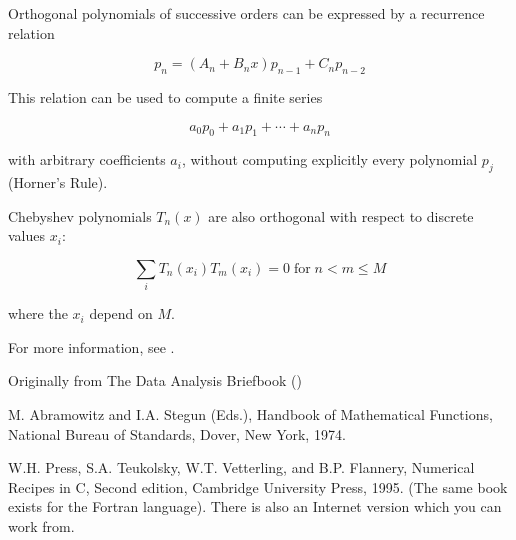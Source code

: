\documentclass[12pt]{article}
\begin{document}
Orthogonal polynomials of successive orders can be expressed by a recurrence relation 

$$ p_n = (A_n + B_n x) p_{n-1} + C_n p_{n-2} $$

This relation can be used to compute a finite series

$$ a_0 p_0 + a_1 p_1 + \cdots + a_np_n $$

with arbitrary coefficients $a_i$, without computing explicitly every polynomial $p_j$ (Horner's Rule).

Chebyshev polynomials $T_n(x)$ are also orthogonal with respect to discrete values $x_i$:

$$ \sum_i T_n(x_i)T_m(x_i) = 0 \; \text{for} \; n < m \le M $$

where the $x_i$ depend on $M$.

For more information, see \cite{Abramowitz74, Press95}.

\begin{thebibliography}{3}

 Originally from The Data Analysis Briefbook
()

 M. Abramowitz and I.A. Stegun (Eds.), Handbook of Mathematical Functions, National Bureau of Standards, Dover, New York, 1974.

  W.H. Press, S.A. Teukolsky, W.T. Vetterling, and B.P. Flannery, Numerical Recipes in C, Second edition, Cambridge University Press, 1995. (The same book exists for the Fortran language). There is also an Internet version which you can work from.

\end{thebibliography}
\end{document}
